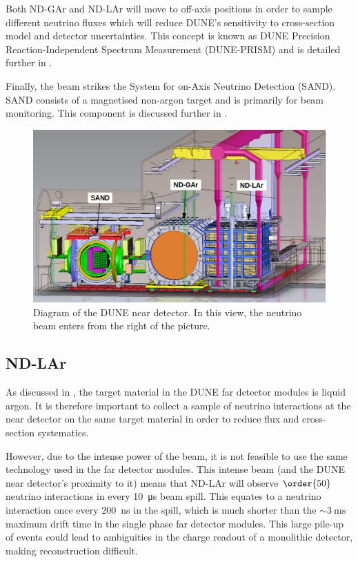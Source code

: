 Both ND-GAr and ND-LAr will move to off-axis positions in order to sample different neutrino fluxes which will reduce DUNE's sensitivity to cross-section model and detector uncertainties.
This concept is known as DUNE Precision Reaction-Independent Spectrum Measurement (DUNE-PRISM) and is detailed further in .

Finally, the beam strikes the System for on-Axis Neutrino Detection (SAND).
SAND consists of a magnetised non-argon target and is primarily for beam monitoring.
This component is discussed further in .

\begin{figure}[h]
  \centering
  \includegraphics[width=.9\linewidth]{files/figures/dune_detector/ndDiag.png}
  \caption[Diagram of the DUNE near detector.]{Diagram of the DUNE near detector. In this view, the neutrino beam enters from the right of the picture.}
  \label{fig:ndDiag}
\end{figure}

\subsection{ND-LAr}
\label{sec:dune:nd:lar}
As discussed in , the target material in the DUNE far detector modules is liquid argon.
It is therefore important to collect a sample of neutrino interactions at the near detector on the same target material in order to reduce flux and cross-section systematics.

However, due to the intense power of the beam, it is not feasible to use the same technology used in the far detector modules.
This intense beam (and the DUNE near detector's proximity to it) means that ND-LAr will observe $\order{50}$ neutrino interactions in every \SI{10}{\micro\second} beam spill.
This equates to a neutrino interaction once every \SI{200}{\nano\second} in the spill, which is much shorter than the $\sim\SI{3}{\milli\second}$ maximum drift time in the single phase far detector modules.
This large pile-up of events could lead to ambiguities in the charge readout of a monolithic detector, making reconstruction difficult.


